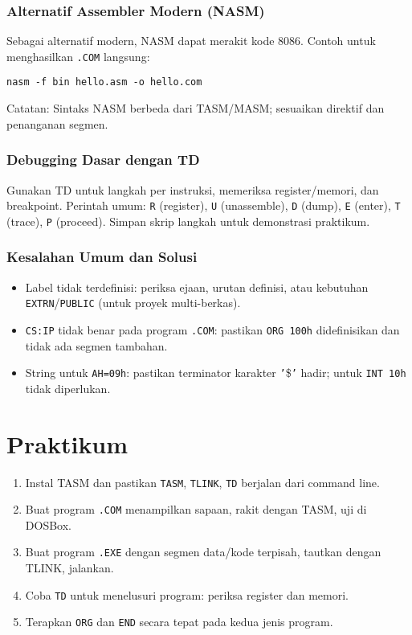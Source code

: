 \documentclass[../main.tex]{subfiles}
\begin{document}
\subsubsection{Alternatif Assembler Modern (NASM)}
Sebagai alternatif modern, NASM dapat merakit kode 8086. Contoh untuk menghasilkan \texttt{.COM} langsung:
\begin{verbatim}
nasm -f bin hello.asm -o hello.com
\end{verbatim}
Catatan: Sintaks NASM berbeda dari TASM/MASM; sesuaikan direktif dan penanganan segmen.

\subsubsection{Debugging Dasar dengan TD}
Gunakan TD untuk langkah per instruksi, memeriksa register/memori, dan breakpoint. Perintah umum: \texttt{R} (register), \texttt{U} (unassemble), \texttt{D} (dump), \texttt{E} (enter), \texttt{T} (trace), \texttt{P} (proceed). Simpan skrip langkah untuk demonstrasi praktikum.

\subsubsection{Kesalahan Umum dan Solusi}
\begin{itemize}
  \item Label tidak terdefinisi: periksa ejaan, urutan definisi, atau kebutuhan \texttt{EXTRN}/\texttt{PUBLIC} (untuk proyek multi-berkas).
  \item \texttt{CS:IP} tidak benar pada program \texttt{.COM}: pastikan \texttt{ORG 100h} didefinisikan dan tidak ada segmen tambahan.
  \item String untuk \texttt{AH=09h}: pastikan terminator karakter \texttt{'}\$\texttt{'} hadir; untuk \texttt{INT 10h} tidak diperlukan.
\end{itemize}

\section{Praktikum}
\begin{enumerate}
  \item Instal TASM dan pastikan \texttt{TASM}, \texttt{TLINK}, \texttt{TD} berjalan dari command line.
  \item Buat program \texttt{.COM} menampilkan sapaan, rakit dengan TASM, uji di DOSBox.
  \item Buat program \texttt{.EXE} dengan segmen data/kode terpisah, tautkan dengan TLINK, jalankan.
  \item Coba \texttt{TD} untuk menelusuri program: periksa register dan memori.
  \item Terapkan \texttt{ORG} dan \texttt{END} secara tepat pada kedua jenis program.
\end{enumerate}
\end{document}
